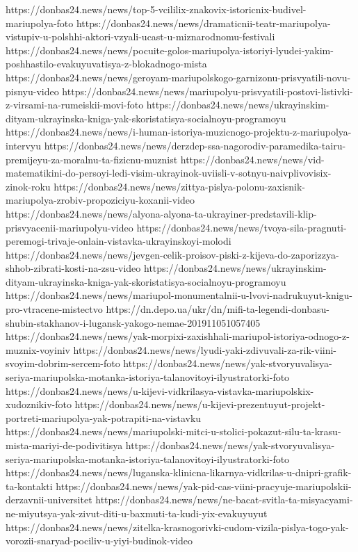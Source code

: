 https://donbas24.news/news/top-5-vcililix-znakovix-istoricnix-budivel-mariupolya-foto
https://donbas24.news/news/dramaticnii-teatr-mariupolya-vistupiv-u-polshhi-aktori-vzyali-ucast-u-miznarodnomu-festivali
https://donbas24.news/news/pocuite-golos-mariupolya-istoriyi-lyudei-yakim-poshhastilo-evakuyuvatisya-z-blokadnogo-mista
https://donbas24.news/news/geroyam-mariupolskogo-garnizonu-prisvyatili-novu-pisnyu-video
https://donbas24.news/news/mariupolyu-prisvyatili-postovi-listivki-z-virsami-na-rumeiskii-movi-foto
https://donbas24.news/news/ukrayinskim-dityam-ukrayinska-kniga-yak-skoristatisya-socialnoyu-programoyu
https://donbas24.news/news/i-human-istoriya-muzicnogo-projektu-z-mariupolya-intervyu
https://donbas24.news/news/derzdep-ssa-nagorodiv-paramedika-tairu-premijeyu-za-moralnu-ta-fizicnu-muznist
https://donbas24.news/news/vid-matematikini-do-persoyi-ledi-visim-ukrayinok-uviisli-v-sotnyu-naivplivovisix-zinok-roku
https://donbas24.news/news/zittya-pislya-polonu-zaxisnik-mariupolya-zrobiv-propoziciyu-koxanii-video
https://donbas24.news/news/alyona-alyona-ta-ukrayiner-predstavili-klip-prisvyacenii-mariupolyu-video
https://donbas24.news/news/tvoya-sila-pragnuti-peremogi-trivaje-onlain-vistavka-ukrayinskoyi-molodi
https://donbas24.news/news/jevgen-celik-proisov-piski-z-kijeva-do-zaporizzya-shhob-zibrati-kosti-na-zsu-video
https://donbas24.news/news/ukrayinskim-dityam-ukrayinska-kniga-yak-skoristatisya-socialnoyu-programoyu
https://donbas24.news/news/mariupol-monumentalnii-u-lvovi-nadrukuyut-knigu-pro-vtracene-mistectvo
https://dn.depo.ua/ukr/dn/mifi-ta-legendi-donbasu-shubin-stakhanov-i-lugansk-yakogo-nemae-201911051057405
https://donbas24.news/news/yak-morpixi-zaxishhali-mariupol-istoriya-odnogo-z-muznix-voyiniv
https://donbas24.news/news/lyudi-yaki-zdivuvali-za-rik-viini-svoyim-dobrim-sercem-foto
https://donbas24.news/news/yak-stvoryuvalisya-seriya-mariupolska-motanka-istoriya-talanovitoyi-ilyustratorki-foto
https://donbas24.news/news/u-kijevi-vidkrilasya-vistavka-mariupolskix-xudoznikiv-foto
https://donbas24.news/news/u-kijevi-prezentuyut-projekt-portreti-mariupolya-yak-potrapiti-na-vistavku
https://donbas24.news/news/mariupolski-mitci-u-stolici-pokazut-silu-ta-krasu-mista-mariyi-de-podivitisya
https://donbas24.news/news/yak-stvoryuvalisya-seriya-mariupolska-motanka-istoriya-talanovitoyi-ilyustratorki-foto
https://donbas24.news/news/luganska-klinicna-likarnya-vidkrilas-u-dnipri-grafik-ta-kontakti
https://donbas24.news/news/yak-pid-cas-viini-pracyuje-mariupolskii-derzavnii-universitet
https://donbas24.news/news/ne-bacat-svitla-ta-misyacyami-ne-miyutsya-yak-zivut-diti-u-baxmuti-ta-kudi-yix-evakuyuyut
https://donbas24.news/news/zitelka-krasnogorivki-cudom-vizila-pislya-togo-yak-vorozii-snaryad-pociliv-u-yiyi-budinok-video

